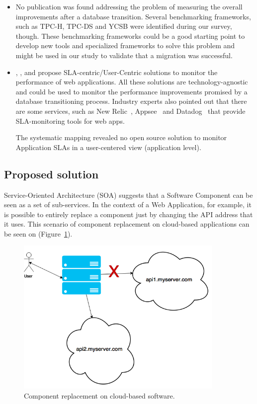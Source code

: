 \documentclass{article}
\begin{document}
\begin{itemize}
\item{No publication was found addressing the problem of measuring the overall improvements after a database transition. Several benchmarking frameworks, such as TPC-H, TPC-DS and YCSB were identified\cite{6616442} during our survey, though. These benchmarking frameworks could be a good starting point to develop new tools and specialized frameworks to solve this problem and might be used in our study to validate that a migration was successful.
}

\item{ \cite{6253526}, \cite{6461875}, \cite{6511780} and \cite{Xiong:2011:APA:2038916.2038931} propose SLA-centric/User-Centric solutions to monitor the performance of web applications. All these solutions are technology-agnostic and could be used to monitor the performance improvements promised by a database transitioning process. Industry experts also pointed out that there are some services, such as New Relic~\cite{newrelic}, Appsee~\cite{appsee} and Datadog~\cite{datadog} that provide SLA-monitoring tools for web apps. 

The systematic mapping revealed no open source solution to monitor Application SLAs in a user-centered view (application level).  
}

\end{itemize}

\subsection{Proposed solution}

Service-Oriented Architecture (SOA) suggests that a Software Component can be seen as a set of sub-services. In the context of a Web Application, for example, it is possible to entirely replace a component just by changing the API address that it uses. This scenario of component replacement on cloud-based applications can be seen on (Figure~\ref{fig:apireplacement}).

\begin{figure}[ht!]
\centering
\includegraphics[width=100mm]{api.png}
\caption{Component replacement on cloud-based software.\label{fig:apireplacement}}
\end{figure}
\end{document}
